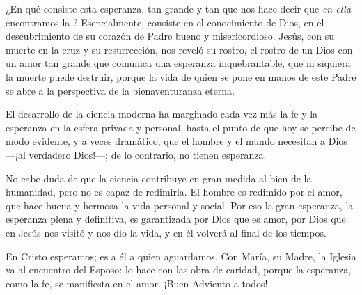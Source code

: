 ¿En qué consiste esta esperanza, tan grande y tan  que nos hace decir que \emph{en ella} encontramos la ? Esencialmente, consiste en el conocimiento de Dios, en el descubrimiento de su corazón de Padre bueno y misericordioso. Jesús, con su muerte en la cruz y su resurrección, nos reveló su rostro, el rostro de un Dios con un amor tan grande que comunica una esperanza inquebrantable, que ni siquiera la muerte puede destruir, porque la vida de quien se pone en manos de este Padre se abre a la perspectiva de la bienaventuranza eterna.

El desarrollo de la ciencia moderna ha marginado cada vez más la fe y la esperanza en la esfera privada y personal, hasta el punto de que hoy se percibe de modo evidente, y a veces dramático, que el hombre y el mundo necesitan a Dios ---¡al verdadero Dios!---; de lo contrario, no tienen esperanza.

No cabe duda de que la ciencia contribuye en gran medida al bien de la humanidad, pero no es capaz de redimirla. El hombre es redimido por el amor, que hace buena y hermosa la vida personal y social. Por eso la gran esperanza, la esperanza plena y definitiva, es garantizada por Dios que es amor, por Dios que en Jesús nos visitó y nos dio la vida, y en él volverá al final de los tiempos.

En Cristo esperamos; es a él a quien aguardamos. Con María, su Madre, la Iglesia va al encuentro del Esposo: lo hace con las obra de caridad, porque la esperanza, como la fe, se manifiesta en el amor. ¡Buen Adviento a todos!


